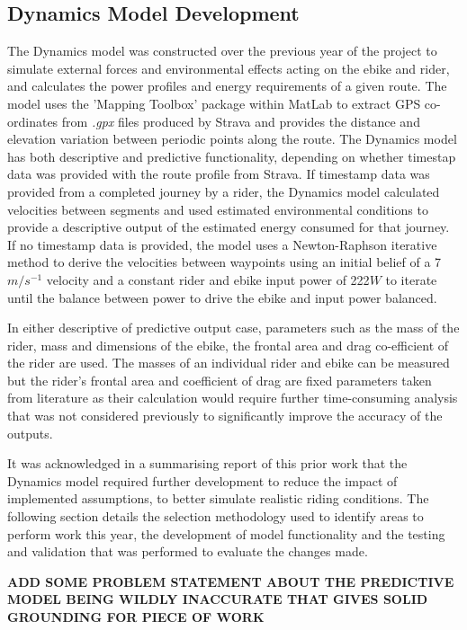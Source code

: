 \documentclass[a4paper, 10pt]{article}
\numberwithin{equation}{section}
\begin{document}
\subsection{Dynamics Model Development}
\label{sec:Dynamics_Development}

The Dynamics model was constructed over the previous year of the project to simulate external forces and environmental effects acting on the ebike and rider, and calculates the power profiles and energy requirements of a given route. \cite{report:dynamics} The model uses the 'Mapping Toolbox' package within MatLab to extract GPS co-ordinates from \textit{.gpx} files produced by Strava and provides the distance and elevation variation between periodic points along the route. \cite{report:dynamics} The Dynamics model has both descriptive and predictive functionality, depending on whether timestap data was provided with the route profile from Strava. If timestamp data was provided from a completed journey by a rider, the Dynamics model calculated velocities between segments and used estimated environmental conditions to provide a descriptive output of the estimated energy consumed for that journey. If no timestamp data is provided, the model uses a Newton-Raphson iterative method to derive the velocities between waypoints using an initial belief of a 7$m/s^{-1}$ velocity and a constant rider and ebike input power of 222$W$ to iterate until the balance between power to drive the ebike and input power balanced.

In either descriptive of predictive output case, parameters such as the mass of the rider, mass and dimensions of the ebike, the frontal area and drag co-efficient of the rider are used. The masses of an individual rider and ebike can be measured but the rider's frontal area and coefficient of drag are fixed parameters taken from literature as their calculation would require further time-consuming analysis that was not considered previously to significantly improve the accuracy of the outputs.

It was acknowledged in a summarising report of this prior work that the Dynamics model required further development to reduce the impact of implemented assumptions, to better simulate realistic riding conditions. \cite{report:dynamics} The following section details the selection methodology used to identify areas to perform work this year, the development of model functionality and the testing and validation that was performed to evaluate the changes made.  

\textbf{ADD SOME PROBLEM STATEMENT ABOUT THE PREDICTIVE MODEL BEING WILDLY INACCURATE THAT GIVES SOLID GROUNDING FOR PIECE OF WORK
}
\end{document}

